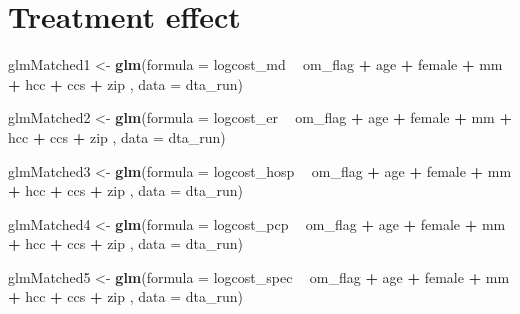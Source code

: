 \documentclass[]{article}
\newenvironment{Shaded}{\begin{snugshade}}{\end{snugshade}}
\newcommand{\KeywordTok}[1]{\textcolor[rgb]{0.13,0.29,0.53}{\textbf{#1}}}
\newcommand{\DataTypeTok}[1]{\textcolor[rgb]{0.13,0.29,0.53}{#1}}
\newcommand{\StringTok}[1]{\textcolor[rgb]{0.31,0.60,0.02}{#1}}
\newcommand{\OperatorTok}[1]{\textcolor[rgb]{0.81,0.36,0.00}{\textbf{#1}}}
\newcommand{\NormalTok}[1]{#1}
\begin{document}
\section{Treatment effect}\label{treatment-effect}

\begin{Shaded}
\begin{Highlighting}[]
\NormalTok{glmMatched1 <-}\StringTok{ }\KeywordTok{glm}\NormalTok{(}\DataTypeTok{formula =}\NormalTok{ logcost_md }\OperatorTok{~}\StringTok{ }\NormalTok{om_flag }\OperatorTok{+}\StringTok{ }\NormalTok{age }\OperatorTok{+}\StringTok{ }\NormalTok{female }\OperatorTok{+}\StringTok{ }\NormalTok{mm }\OperatorTok{+}\StringTok{ }\NormalTok{hcc }\OperatorTok{+}\StringTok{ }\NormalTok{ccs }\OperatorTok{+}\StringTok{ }\NormalTok{zip ,}
                   \DataTypeTok{data    =}\NormalTok{ dta_run)}

\NormalTok{glmMatched2 <-}\StringTok{ }\KeywordTok{glm}\NormalTok{(}\DataTypeTok{formula =}\NormalTok{ logcost_er }\OperatorTok{~}\StringTok{ }\NormalTok{om_flag }\OperatorTok{+}\StringTok{ }\NormalTok{age }\OperatorTok{+}\StringTok{ }\NormalTok{female }\OperatorTok{+}\StringTok{ }\NormalTok{mm }\OperatorTok{+}\StringTok{ }\NormalTok{hcc }\OperatorTok{+}\StringTok{ }\NormalTok{ccs }\OperatorTok{+}\StringTok{ }\NormalTok{zip ,}
                   \DataTypeTok{data    =}\NormalTok{ dta_run)}

\NormalTok{glmMatched3 <-}\StringTok{ }\KeywordTok{glm}\NormalTok{(}\DataTypeTok{formula =}\NormalTok{ logcost_hosp }\OperatorTok{~}\StringTok{ }\NormalTok{om_flag }\OperatorTok{+}\StringTok{ }\NormalTok{age }\OperatorTok{+}\StringTok{ }\NormalTok{female }\OperatorTok{+}\StringTok{ }\NormalTok{mm }\OperatorTok{+}\StringTok{ }\NormalTok{hcc }\OperatorTok{+}\StringTok{ }\NormalTok{ccs }\OperatorTok{+}\StringTok{ }\NormalTok{zip ,}
                   \DataTypeTok{data    =}\NormalTok{ dta_run)}

\NormalTok{glmMatched4 <-}\StringTok{ }\KeywordTok{glm}\NormalTok{(}\DataTypeTok{formula =}\NormalTok{ logcost_pcp }\OperatorTok{~}\StringTok{ }\NormalTok{om_flag }\OperatorTok{+}\StringTok{ }\NormalTok{age }\OperatorTok{+}\StringTok{ }\NormalTok{female }\OperatorTok{+}\StringTok{ }\NormalTok{mm }\OperatorTok{+}\StringTok{ }\NormalTok{hcc }\OperatorTok{+}\StringTok{ }\NormalTok{ccs }\OperatorTok{+}\StringTok{ }\NormalTok{zip ,}
                   \DataTypeTok{data    =}\NormalTok{ dta_run)}

\NormalTok{glmMatched5 <-}\StringTok{ }\KeywordTok{glm}\NormalTok{(}\DataTypeTok{formula =}\NormalTok{ logcost_spec }\OperatorTok{~}\StringTok{ }\NormalTok{om_flag }\OperatorTok{+}\StringTok{ }\NormalTok{age }\OperatorTok{+}\StringTok{ }\NormalTok{female }\OperatorTok{+}\StringTok{ }\NormalTok{mm }\OperatorTok{+}\StringTok{ }\NormalTok{hcc }\OperatorTok{+}\StringTok{ }\NormalTok{ccs }\OperatorTok{+}\StringTok{ }\NormalTok{zip ,}
                   \DataTypeTok{data    =}\NormalTok{ dta_run)}



\end{Highlighting}
\end{Shaded}
\end{document}
